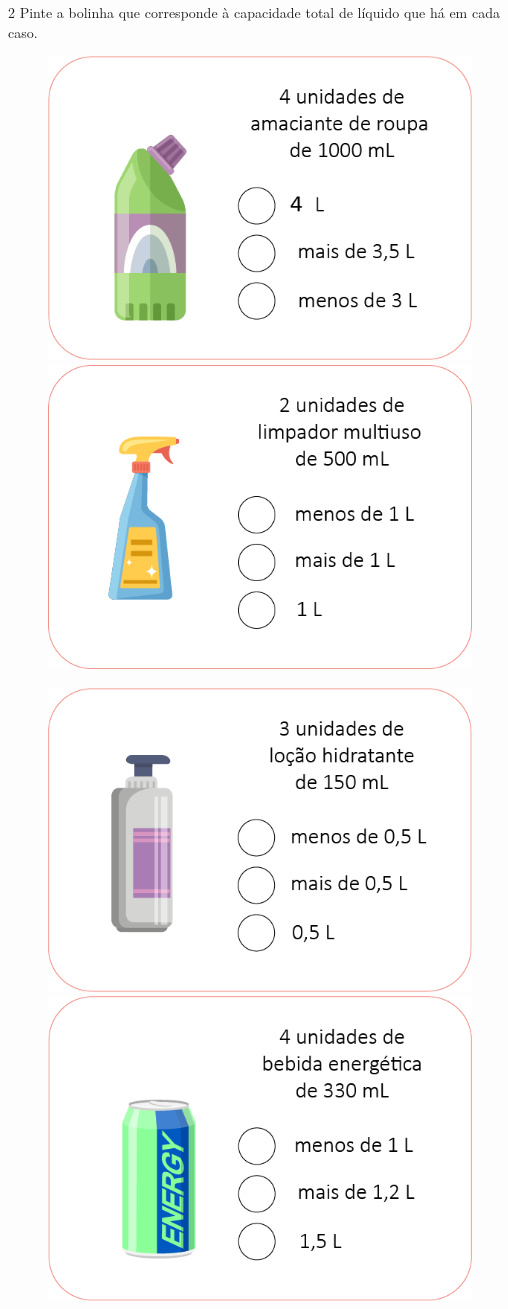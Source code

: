 
\pagebreak
\num{2} Pinte a bolinha que corresponde à capacidade total de líquido que há em cada caso.

\begin{figure}[htpb!]
\includegraphics[width=.5\textwidth]{media/image21.png}
\includegraphics[width=.5\textwidth]{media/image22.png}
\end{figure}

\begin{figure}[htpb!]
\includegraphics[width=.5\textwidth]{media/image23.png}
\includegraphics[width=.5\textwidth]{media/image24.png}
\end{figure}

